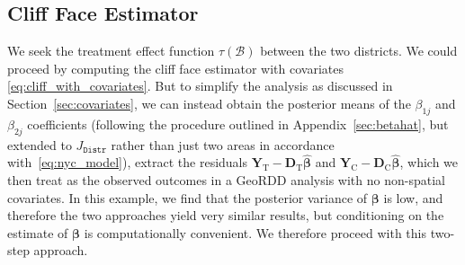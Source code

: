 \documentclass[letter,12pt]{article}
\newcommand{\district}{\mathtt{Distr}}
\newcommand{\treat}{\mathrm{T}}
\newcommand{\ctrol}{\mathrm{C}}
\newcommand{\Yvec}{\mathbold{Y}}
\newcommand{\yt}{\Yvec_{\treat}}
\newcommand{\yc}{\Yvec_{\ctrol}}
\newcommand{\betavec}{\mathbold{\beta}}
\newcommand{\border}{\mathcal{B}}
\newcommand{\Dmat}{\mathbold{D}}
\begin{document}
\hypertarget{cliff-face-estimator}{%
\subsection{Cliff Face Estimator}\label{cliff-face-estimator}}



We seek the treatment effect function \(\tau(\border)\) between the two districts.
We could proceed by computing the cliff face estimator with covariates \eqref{eq:cliff_with_covariates}.
But to simplify the analysis as discussed in Section~\ref{sec:covariates}, we can instead obtain the posterior means of the \(\beta_{1j}\) and \(\beta_{2j}\) coefficients (following the procedure outlined in Appendix~\ref{sec:betahat}, but extended to \(J_\district\) rather than just two areas in accordance with~\eqref{eq:nyc_model}), extract the residuals \(\yt{}-\Dmat_\treat{} \hat{\betavec}\) and \(\yc{}-\Dmat_\ctrol{} \hat{\betavec}\), which we then treat as the observed outcomes in a GeoRDD analysis with no non-spatial covariates.
In this example, we find that the posterior variance of \(\betavec\) is low, and therefore the two approaches yield very similar results, but conditioning on the estimate of \(\betavec\) is computationally convenient.
We therefore proceed with this two-step approach.
\end{document}
